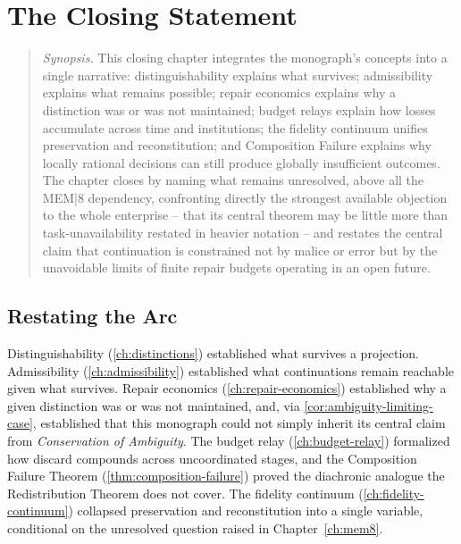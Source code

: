 \chapter{The Closing Statement}
\label{ch:synthesis}

\begin{quotation}
\noindent\textit{Synopsis.} This closing chapter integrates the
monograph's concepts into a single narrative: distinguishability explains
what survives; admissibility explains what remains possible; repair
economics explains why a distinction was or was not maintained; budget
relays explain how losses accumulate across time and institutions; the
fidelity continuum unifies preservation and reconstitution; and Composition
Failure explains why locally rational decisions can still produce globally
insufficient outcomes. The chapter closes by naming what remains
unresolved, above all the MEM|8 dependency, confronting directly the
strongest available objection to the whole enterprise -- that its central
theorem may be little more than task-unavailability restated in heavier
notation -- and restates the central claim
that continuation is constrained not by malice or error but by the
unavoidable limits of finite repair budgets operating in an open future.
\end{quotation}

\section{Restating the Arc}

Distinguishability (\cref{ch:distinctions}) established what survives a
projection. Admissibility (\cref{ch:admissibility}) established what
continuations remain reachable given what survives. Repair economics
(\cref{ch:repair-economics}) established why a given distinction was or
was not maintained, and, via \cref{cor:ambiguity-limiting-case},
established that this monograph could not simply inherit its central
claim from \emph{Conservation of Ambiguity}. The budget relay
(\cref{ch:budget-relay}) formalized how discard compounds across
uncoordinated stages, and the Composition Failure Theorem
(\cref{thm:composition-failure}) proved the diachronic analogue the
Redistribution Theorem does not cover. The fidelity continuum
(\cref{ch:fidelity-continuum}) collapsed preservation and
reconstitution into a single variable, conditional on the unresolved
question raised in Chapter~\ref{ch:mem8}.

